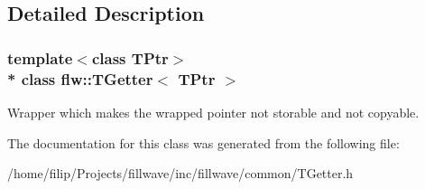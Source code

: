 \subsection{Detailed Description}
\subsubsection*{template$<$class T\+Ptr$>$\\*
class flw\+::\+T\+Getter$<$ T\+Ptr $>$}

Wrapper which makes the wrapped pointer not storable and not copyable. 

The documentation for this class was generated from the following file\+:\begin{DoxyCompactItemize}
\item 
/home/filip/\+Projects/fillwave/inc/fillwave/common/T\+Getter.\+h\end{DoxyCompactItemize}
